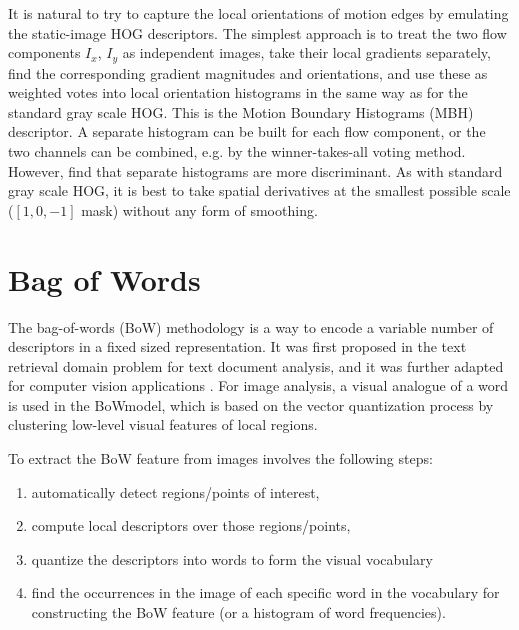 It is natural to try to capture the local orientations of motion edges by emulating the static-image HOG descriptors. The simplest approach is to treat the two flow components $I_x$, $I_y$ as independent images, take their local gradients separately, find the corresponding gradient magnitudes and orientations, and use these as weighted votes into local orientation histograms in the same way as for the standard gray scale HOG. This is the Motion Boundary Histograms (MBH) descriptor. A separate histogram can be built for each flow component, or the two channels can be combined, e.g. by the winner-takes-all voting method. However, \cite{dalal2005histograms} find that separate histograms are more discriminant. As with standard gray scale HOG, it is best to take spatial derivatives at the smallest possible scale ($\left[ 1, 0,-1\right]$ mask) without any form of smoothing.



\section{Bag of Words}
The bag-of-words (BoW) methodology is a way to encode a variable number of descriptors in a fixed sized representation. It was first proposed in the text retrieval domain problem for text document analysis, and it was further adapted for computer vision applications \cite{bosch2007best}. For image analysis, a visual analogue of a word is used in the BoWmodel, which is based on the vector quantization process by clustering low-level visual features of local regions. 

To extract the BoW feature from images involves the following steps: 
\begin{enumerate}
\item automatically detect regions/points of interest,
\item compute local descriptors over those regions/points,
\item quantize the descriptors into words to form the visual vocabulary
\item find the occurrences in the image of each specific word in the vocabulary for constructing the BoW feature (or a histogram of word frequencies).
\end{enumerate}

